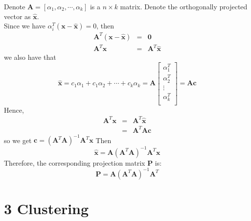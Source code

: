 \documentclass[20pt]{article}
\newcommand{\A}{\mathbf{A}}
\newcommand{\x}{\mathbf{x}}
\begin{document}
 Denote $\A = [\alpha_1, \alpha_2, \cdots, \alpha_k]$ is a $n\times k$ matrix. Denote the orthogonally projected vector as $\hat{\x}$. \\
 Since we have $\alpha_i^T(\x - \hat{\x})=0$, then
 \begin{eqnarray*}
    \A^T(\x-\hat{\x}) &=& \textbf{0} \\
    \A^T \x &=& \A^T \hat{\x}
 \end{eqnarray*}
 we also have that
 $$\hat{\x} = c_1\alpha_1 + c_1\alpha_2 + \cdots + c_k\alpha_k = \A \begin{bmatrix}
                                                                        \alpha_1^T \\
                                                                        \alpha_2^T \\
                                                                        \vdots \\
                                                                        \alpha_k^T \\
                                                                      \end{bmatrix} = \A\mathbf{c}$$
 Hence,
 \begin{eqnarray*}
    \A^T \x &=& \A^T \hat{\x} \\
    &=& \A^T\A\mathbf{c}
 \end{eqnarray*}
 so we get $\mathbf{c} = (\A^T\A)^{-1}\A^T\x$
 Then $$\hat{\x} = \A(\A^T\A)^{-1}\A^T\x$$
 Therefore, the corresponding projection matrix $\mathbf{P}$ is:
 $$\mathbf{P} = \A(\A^T\A)^{-1}\A^T$$

\section*{3 Clustering}
\end{document}
